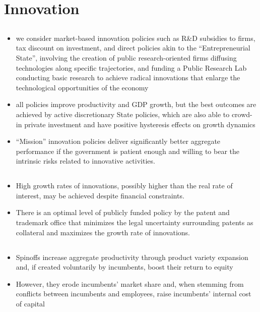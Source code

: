 \documentclass[10pt]{article} %
\begin{document}
\section{Innovation}
    \subsection{\cite{Dosietal2023}}
    \begin{itemize}
        \item we consider market-based innovation policies such as R\&D subsidies to firms, tax discount on investment, and direct policies akin to the “Entrepreneurial State”, involving the creation of public research-oriented firms diffusing technologies along specific trajectories, and funding a Public Research Lab conducting basic research to achieve radical innovations that enlarge the technological opportunities of the economy
        \item all policies improve productivity and GDP growth, but the best outcomes are achieved by active discretionary State policies, which are also able to crowd-in private investment and have positive hysteresis effects on growth dynamics
        \item “Mission” innovation policies deliver significantly better aggregate performance if the government is patient enough and willing to bear the intrinsic risks related to innovative activities.
    \end{itemize}

    \subsection{\cite{AmableChatelainRalf2010}}
    \begin{itemize}
        \item High growth rates of innovations, possibly higher than the real rate of interest, may be achieved despite financial constraints. 
        \item There is an optimal level of publicly funded policy by the patent and trademark office that minimizes the legal uncertainty surrounding patents as collateral and maximizes the growth rate of innovations.
    \end{itemize}
    \subsection{\cite{IacopettaMinettiMurro2024}}
    \begin{itemize}
        \item Spinoffs increase aggregate productivity through product variety expansion and, if created voluntarily by incumbents, boost their return to equity
        \item However, they erode incumbents' market share and, when stemming from conflicts between incumbents and employees, raise incumbents' internal cost of capital
    \end{itemize}
\end{document}
